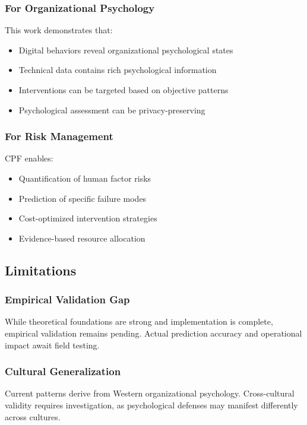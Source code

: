 \documentclass[11pt,a4paper]{article}
\begin{document}
\subsubsection{For Organizational Psychology}

This work demonstrates that:
\begin{itemize}
\item Digital behaviors reveal organizational psychological states
\item Technical data contains rich psychological information
\item Interventions can be targeted based on objective patterns
\item Psychological assessment can be privacy-preserving
\end{itemize}

\subsubsection{For Risk Management}

CPF enables:
\begin{itemize}
\item Quantification of human factor risks
\item Prediction of specific failure modes
\item Cost-optimized intervention strategies
\item Evidence-based resource allocation
\end{itemize}

\subsection{Limitations}

\subsubsection{Empirical Validation Gap}

While theoretical foundations are strong and implementation is complete, empirical validation remains pending. Actual prediction accuracy and operational impact await field testing.

\subsubsection{Cultural Generalization}

Current patterns derive from Western organizational psychology. Cross-cultural validity requires investigation, as psychological defenses may manifest differently across cultures.
\end{document}
